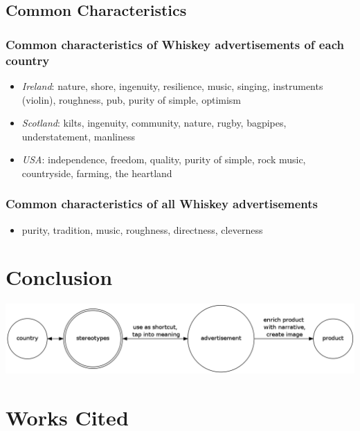 \documentclass[12pt]{article}
\begin{document}
\subsection{Common Characteristics}

\subsubsection{Common characteristics of Whiskey advertisements of each country}

\begin{itemize}
 \item \emph{Ireland}: nature, shore, ingenuity, resilience, music, singing, instruments (violin), roughness, pub, purity of simple, optimism
 \item \emph{Scotland}: kilts, ingenuity, community, nature, rugby, bagpipes, understatement, manliness
 \item \emph{USA}: independence, freedom, quality, purity of simple, rock music, countryside, farming, the heartland
\end{itemize}

\subsubsection{Common characteristics of all Whiskey advertisements}

\begin{itemize}
 \item purity, tradition, music, roughness, directness, cleverness
\end{itemize}

\section{Conclusion}
\includegraphics[scale=.4]{concepts.png}
\section{Works Cited}

\end{document}
